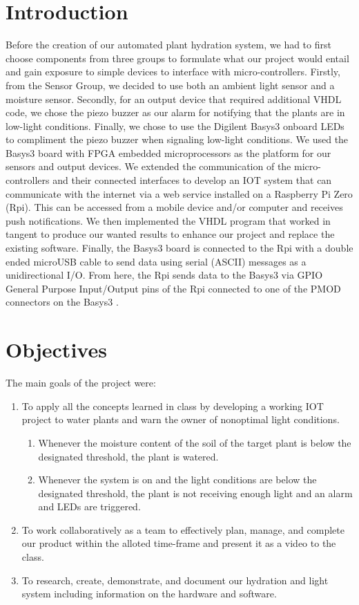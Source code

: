 \documentclass[a4paper]{article}
\begin{document}
\section{Introduction}
Before the creation of our automated plant hydration system, we had to first choose components from three groups to formulate what our project would entail and gain exposure to simple devices to interface with micro-controllers. Firstly, from the Sensor Group, we decided to use both an ambient light sensor and a moisture sensor. Secondly, for an output device that required additional VHDL code, we chose the piezo buzzer as our alarm for notifying that the plants are in low-light conditions. Finally, we chose to use the Digilent Basys3 onboard LEDs to compliment the piezo buzzer when signaling low-light conditions. We used the Basys3 board with FPGA embedded microprocessors as the platform for our sensors and output devices. We extended the communication of the micro-controllers and their connected interfaces to develop an IOT system that can communicate with the internet via a web service installed on a Raspberry Pi Zero (Rpi). This can be accessed from a mobile device and/or computer and receives push notifications. We then implemented the VHDL program that worked in tangent to produce our wanted results to enhance our project and replace the existing software. Finally, the Basys3 board is connected to the Rpi with a double ended microUSB cable to send data using serial (ASCII) messages as a unidirectional I/O. From here, the Rpi sends data to the Basys3 via GPIO General Purpose Input/Output pins of the Rpi connected to one of the PMOD connectors on the Basys3 \cite{Git}.



\section{Objectives}
The main goals of the project were:
\begin{enumerate}
    \item To apply all the concepts learned in class by developing a working IOT project to water plants and warn the owner of nonoptimal light conditions.
    \begin{enumerate}
        \item Whenever the moisture content of the soil of the target plant is below the designated threshold, the plant is watered.
        \item Whenever the system is on and the light conditions are below the designated threshold, the plant is not receiving enough light and an alarm and LEDs are triggered.
    \end{enumerate}
    \item To work collaboratively as a team to effectively plan, manage, and complete our product within the alloted time-frame and present it as a video to the class.
    \item To research, create, demonstrate, and document our hydration and light system including information on the hardware and software.
\end{enumerate}
\end{document}
